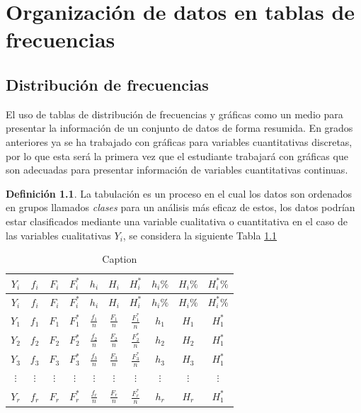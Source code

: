 \documentclass[
  11pt,
]{krantz}
\theoremstyle{definition}
\newtheorem{definition}{Definición}[chapter]
\theoremstyle{definition}
\theoremstyle{definition}
\theoremstyle{definition}
\theoremstyle{remark}
\begin{document}
\hypertarget{organizaciuxf3n-de-datos-en-tablas-de-frecuencias}{%
\chapter{Organización de datos en tablas de frecuencias}\label{organizaciuxf3n-de-datos-en-tablas-de-frecuencias}}

\hypertarget{distribuciuxf3n-de-frecuencias}{%
\section{Distribución de frecuencias}\label{distribuciuxf3n-de-frecuencias}}

El uso de tablas de distribución de frecuencias y gráficas como un medio para presentar la información
de un conjunto de datos de forma resumida. En grados anteriores ya se ha trabajado con gráficas para
variables cuantitativas discretas, por lo que esta será la primera vez que el estudiante trabajará con
gráficas que son adecuadas para presentar información de variables cuantitativas continuas.

\begin{definition}
La tabulación es un proceso en el cual los datos son ordenados en grupos llamados \emph{clases} para un análisis más eficaz de estos, los datos podrían estar clasificados mediante una variable cualitativa o cuantitativa en el caso de las variables cualitativas \(Y_i\), se considera la siguiente Tabla \ref{tab:ww}
\end{definition}

\begin{longtable}[]{@{}cccccccccc@{}}
\caption{\label{tab:ww} Caption}\tabularnewline
\toprule
\(Y_i\) & \(f_i\) & \(F_i\) & \(F_i^*\) & \(h_i\) & \(H_i\) & \(H_i^*\) & \(h_i\%\) & \(H_i\%\) & \(H_i^*\%\) \\
\midrule
\endfirsthead
\toprule
\(Y_i\) & \(f_i\) & \(F_i\) & \(F_i^*\) & \(h_i\) & \(H_i\) & \(H_i^*\) & \(h_i\%\) & \(H_i\%\) & \(H_i^*\%\) \\
\midrule
\endhead
\(Y_1\) & \(f_1\) & \(F_1\) & \(F_1^*\) & \(\frac{f_1}{n}\) & \(\frac{F_1}{n}\) & \(\frac{F_1^*}{n}\) & \(h_1\) & \(H_1\) & \(H_1^*\) \\
\(Y_2\) & \(f_2\) & \(F_2\) & \(F_2^*\) & \(\frac{f_2}{n}\) & \(\frac{F_2}{n}\) & \(\frac{F_2^*}{n}\) & \(h_2\) & \(H_2\) & \(H_1^*\) \\
\(Y_3\) & \(f_3\) & \(F_3\) & \(F_3^*\) & \(\frac{f_3}{n}\) & \(\frac{F_3}{n}\) & \(\frac{F_3^*}{n}\) & \(h_3\) & \(H_3\) & \(H_1^*\) \\
\(\vdots\) & \(\vdots\) & \(\vdots\) & \(\vdots\) & \(\vdots\) & \(\vdots\) & \(\vdots\) & \(\vdots\) & \(\vdots\) & \(\vdots\) \\
\(Y_r\) & \(f_r\) & \(F_r\) & \(F_r^*\) & \(\frac{f_r}{n}\) & \(\frac{F_r}{n}\) & \(\frac{F_r^*}{n}\) & \(h_r\) & \(H_r\) & \(H_1^*\) \\
\bottomrule
\end{longtable}
\end{document}
